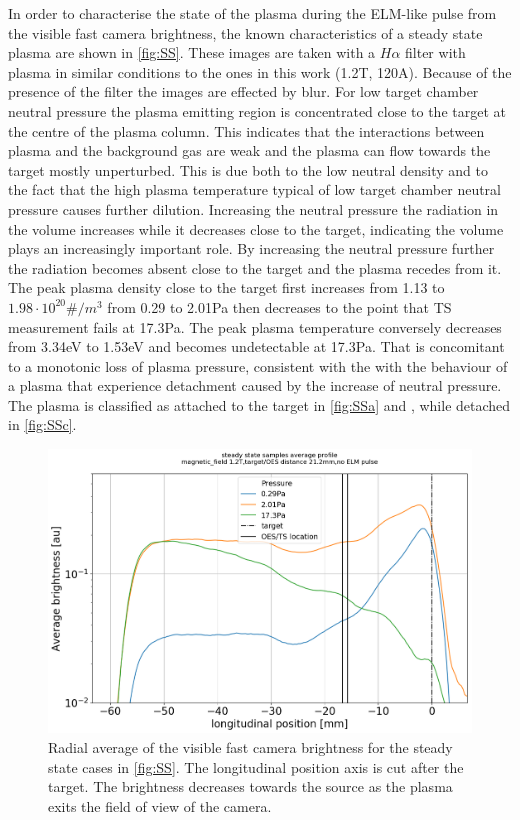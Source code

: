In order to characterise the state of the plasma during the ELM-like pulse from the visible fast camera brightness, the known characteristics of a steady state plasma are shown in \autoref{fig:SS}. \cite{Akkermans2020,Perillo2019}
These images are taken with a $H\alpha$ filter with plasma in similar conditions to the ones in this work (1.2T, 120A). Because of the presence of the filter the images are effected by blur.
For low target chamber neutral pressure the plasma emitting region is concentrated close to the target at the centre of the plasma column. This indicates that the interactions between plasma and the background gas are weak and the plasma can flow towards the target mostly unperturbed. This is due both to the low neutral density and to the fact that the high plasma temperature typical of low target chamber neutral pressure causes further dilution. \cite{DenHarder2015} Increasing the neutral pressure the radiation in the volume increases while it decreases close to the target, indicating the volume plays an increasingly important role. By increasing the neutral pressure further the radiation becomes absent close to the target and the plasma recedes from it. The peak plasma density close to the target first increases from 1.13 to $1.98 \cdot 10^{20}\#/m^3$ from 0.29 to 2.01Pa then decreases to the point that TS measurement fails at 17.3Pa. The peak plasma temperature conversely decreases from 3.34eV to 1.53eV and becomes undetectable at 17.3Pa. That is concomitant to a monotonic loss of plasma pressure, consistent with the with the behaviour of a plasma that experience detachment caused by the increase of neutral pressure.\cite{Perillo2019} The plasma is classified as attached to the target in \autoref{fig:SSa} and , while detached in \autoref{fig:SSc}.

\begin{figure}[!ht]
	\centering
	\includegraphics[width=0.7\linewidth,trim={7 0 9 45},clip]{Chapters/chapter3/figs/SS_scan4.png}
	\caption{Radial average of the visible fast camera brightness for the steady state cases in \autoref{fig:SS}. The longitudinal position axis is cut after the target. The brightness decreases towards the source as the plasma exits the field of view of the camera.}
	\label{fig:SS2}
\end{figure}

